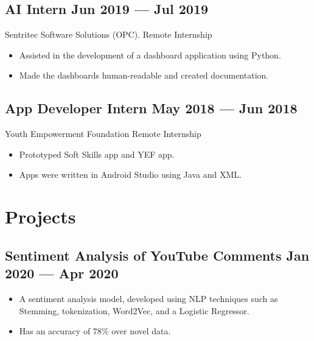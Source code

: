\documentclass[a4,10pt]{article}
\newcommand{\subtext}[1]{
#1\par\vspace{-0.2cm}}
\newenvironment{zitemize}{
\begin{itemize}\itemsep0pt \parskip0pt \parsep1pt}
{\end{itemize}\vspace{-0.5cm}}
\begin{document}
\subsection*{AI Intern \hfill Jun 2019 --- Jul 2019} 
\subtext{Sentritec Software Solutions (OPC). \hfill Remote Internship} 
    \begin{zitemize}
        \item Assisted in the development of a dashboard application using Python.
        \item Made the dashboards human-readable and created documentation.
    \end{zitemize}

\subsection*{App Developer Intern  \hfill May 2018 --- Jun 2018} 
\subtext{Youth Empowerment Foundation \hfill Remote Internship} 
    \begin{zitemize}
        \item Prototyped Soft Skills app and YEF app.
        \item Apps were written in Android Studio using Java and XML.
    \end{zitemize}



\section{Projects} %


\subsection*{Sentiment Analysis of YouTube Comments \hfill Jan 2020 --- Apr 2020} 
    \begin{zitemize}
        \item A sentiment analysis model, developed using NLP techniques such as Stemming, tokenization, Word2Vec, and a Logistic Regressor.
        \item Has an accuracy of 78\% over novel data.
    \end{zitemize}
\end{document}
